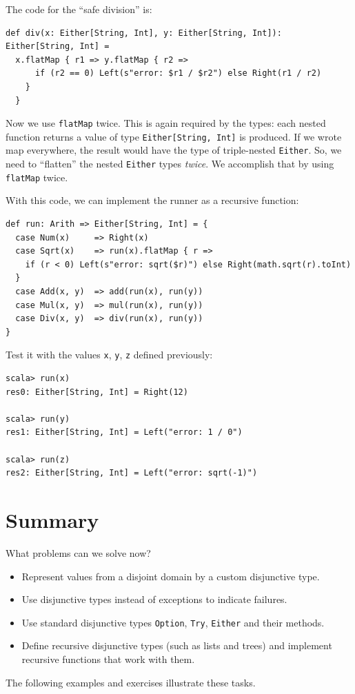 The code for the \textsf{``}safe division\textsf{''} is:
\begin{lstlisting}
def div(x: Either[String, Int], y: Either[String, Int]): Either[String, Int] =
  x.flatMap { r1 => y.flatMap { r2 =>
      if (r2 == 0) Left(s"error: $r1 / $r2") else Right(r1 / r2)
    }
  }
\end{lstlisting}
Now we use \lstinline!flatMap! twice. This is again required by the
types: each nested function returns a value of type \lstinline!Either[String, Int]!
is produced. If we wrote map everywhere, the result would have the
type of triple-nested \lstinline!Either!. So, we need to \textsf{``}flatten\textsf{''}
the nested \lstinline!Either! types \emph{twice}. We accomplish that
by using \lstinline!flatMap! twice.

With this code, we can implement the runner as a recursive function:
\begin{lstlisting}
def run: Arith => Either[String, Int] = {
  case Num(x)     => Right(x)
  case Sqrt(x)    => run(x).flatMap { r =>
    if (r < 0) Left(s"error: sqrt($r)") else Right(math.sqrt(r).toInt)
  }
  case Add(x, y)  => add(run(x), run(y))
  case Mul(x, y)  => mul(run(x), run(y))
  case Div(x, y)  => div(run(x), run(y))
}
\end{lstlisting}
Test it with the values \lstinline!x!, \lstinline!y!, \lstinline!z!
defined previously:
\begin{lstlisting}
scala> run(x)
res0: Either[String, Int] = Right(12)

scala> run(y)
res1: Either[String, Int] = Left("error: 1 / 0")

scala> run(z)
res2: Either[String, Int] = Left("error: sqrt(-1)")
\end{lstlisting}


\section{Summary}

What problems can we solve now?
\begin{itemize}
\item Represent values from a disjoint domain by a custom disjunctive type.
\item Use disjunctive types instead of exceptions to indicate failures.
\item Use standard disjunctive types \lstinline!Option!, \lstinline!Try!,
\lstinline!Either! and their methods.
\item Define recursive disjunctive types (such as lists and trees) and implement
recursive functions that work with them.
\end{itemize}
The following examples and exercises illustrate these tasks.

